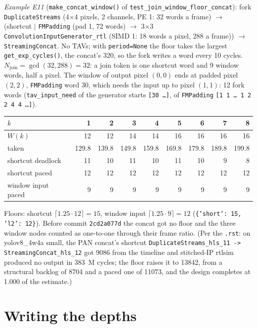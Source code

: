 \documentclass[10pt,a4paper]{article}
\newcommand{\code}[1]{\texttt{#1}}
\begin{document}
\emph{Example E11} (\code{make\_concat\_window()} of \code{test\_join\_window\_floor\_concat}):
fork \code{DuplicateStreams} (4$\times$4 pixels, 2 channels, PE 1: 32 words a frame)
$\to$ (shortcut $|$ \code{FMPadding} (pad 1, 72 words) $\to$ 3$\times$3
\code{ConvolutionInputGenerator\_rtl} (SIMD 1: 18 words a pixel, 288 a frame)) $\to$
\code{StreamingConcat}. No TAVs; with \code{period=None} the floor takes the largest
\code{get\_exp\_cycles()}, the concat's 320, so the fork writes a word every 10 cycles.
$N_{\mathrm{join}}=\gcd(32,288)=32$: a join token is one shortcut word and 9 window
words, half a pixel. The window of output pixel $(0,0)$ ends at padded pixel $(2,2)$,
\code{FMPadding} word 30, which needs the input up to pixel $(1,1)$: 12 fork words
(\code{tav\_input\_need} of the generator starts \code{[30 \dots]}, of \code{FMPadding}
\code{[1 1 \dots\ 1 2 2 4 4 \dots]}).
\begin{center}\small
\begin{tabular}{@{}lrrrrrrrr@{}}
\toprule
$k$ & 1&2&3&4&5&6&7&8\\
\midrule
$W(k)$ & 12&12&14&14&16&16&16&16\\
taken & 129.8&139.8&149.8&159.8&169.8&179.8&189.8&199.8\\
shortcut deadlock & 11&10&11&10&11&10&9&8\\
shortcut paced & 12&12&12&12&12&12&12&12\\
window input paced & 9&9&9&9&9&9&9&9\\
\bottomrule
\end{tabular}
\end{center}
Floors: shortcut $\lceil1.25\cdot12\rceil=15$, window input $\lceil1.25\cdot9\rceil=12$
(\code{\{'short': 15, 'l2': 12\}}). Before commit \code{2cd2a077d} the concat got no
floor and the three window nodes counted as one-to-one through their frame ratio.
(Per the \code{.rst}: on yolov8\_4w4a small, the PAN concat's shortcut
\code{DuplicateStreams\_hls\_11 -> StreamingConcat\_hls\_12} got 9086 from the timeline
and stitched-IP rtlsim produced no output in 383~M cycles; the floor raises it to
13842, from a structural backlog of 8704 and a paced one of 11073, and the design
completes at 1.000 of the estimate.)

\section{Writing the depths}\label{sec:write}
\end{document}
